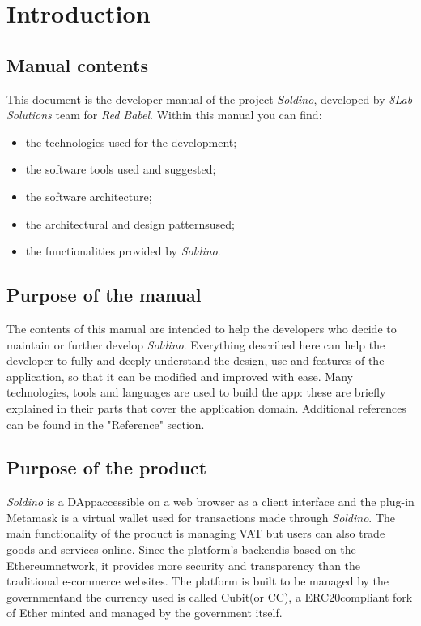 \section{Introduction} 
\subsection{Manual contents}
This document is the developer manual of the project \textit{Soldino}, developed by \textit{8Lab Solutions} team for \textit{Red Babel}.\newline
Within this manual you can find:
\begin{itemize}
	\item the technologies used for the development;
	\item the software tools used and suggested;
	\item the software architecture;
	\item the architectural and design patterns\glosp used;
	\item the functionalities provided by \textit{Soldino}.
\end{itemize}

\subsection{Purpose of the manual}
The contents of this manual are intended to help the developers who decide to 
maintain or further develop \textit{Soldino}. Everything described here can 
help the developer to fully and deeply understand the design, use and features 
of the application, so that it can be modified and improved with ease.\newline
Many technologies, tools and languages are used to build the app: these are 
 briefly explained in their parts that cover the application domain. 
Additional references can be found in the "Reference" section.

\subsection{Purpose of the product}
\textit{Soldino} is a DApp\glosp accessible on a web browser as a 
client interface and the plug-in Metamask is a virtual wallet used for 
transactions made through \textit{Soldino}.\newline
The main functionality of the product is managing VAT but users can also
trade goods and services online. Since the platform's backend\glosp is based on the 
Ethereum\glosp network, it provides more security and transparency than the 
traditional e-commerce websites.\newline
The platform is built to be managed by the government\glosp and the currency used is 
called Cubit\glosp (or CC), a ERC20\glosp compliant fork of Ether minted and managed by 
the government itself.

